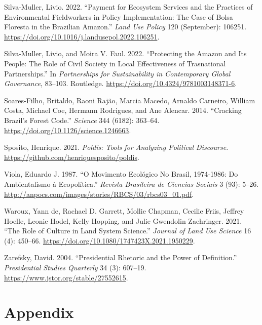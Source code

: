 \documentclass[
  12pt,
]{article}
\newlength{\cslhangindent}
\newlength{\cslentryspacingunit} %
\newenvironment{CSLReferences}[2] %
 {%
  \setlength{\parindent}{0pt}
  \ifodd #1
  \let\oldpar\par
  \def\par{\hangindent=\cslhangindent\oldpar}
  \fi
  \setlength{\parskip}{#2\cslentryspacingunit}
 }%
 {}
\begin{document}
\begin{CSLReferences}{1}{0}
\leavevmode{}%
Silva-Muller, Livio. 2022. {``Payment for Ecosystem Services and the
Practices of Environmental Fieldworkers in Policy Implementation: The
Case of Bolsa Floresta in the Brazilian Amazon.''} \emph{Land Use
Policy} 120 (September): 106251.
\url{https://doi.org/10.1016/j.landusepol.2022.106251}.

\leavevmode{}%
Silva-Muller, Livio, and Moira V. Faul. 2022. {``Protecting the Amazon
and Its People: The Role of Civil Society in Local Effectiveness of
Trasnational Partnerships.''} In \emph{Partnerships for Sustainability
in Contemporary Global Governance}, 83--103. Routledge.
\url{https://doi.org/10.4324/9781003148371-6}.

\leavevmode{}%
Soares-Filho, Britaldo, Raoni Rajão, Marcia Macedo, Arnaldo Carneiro,
William Costa, Michael Coe, Hermann Rodrigues, and Ane Alencar. 2014.
{``Cracking Brazil's Forest Code.''} \emph{Science} 344 (6182): 363--64.
\url{https://doi.org/10.1126/science.1246663}.

\leavevmode{}%
Sposito, Henrique. 2021. \emph{Poldis: Tools for Analyzing Political
Discourse}. \url{https://github.com/henriquesposito/poldis}.

\leavevmode{}%
Viola, Eduardo J. 1987. {``O Movimento Ecológico No Brasil, 1974-1986:
Do Ambientalismo à Ecopolítica.''} \emph{Revista Brasileira de Ciencias
Sociais} 3 (93): 5--26.
\url{http://anpocs.com/images/stories/RBCS/03/rbcs03_01.pdf}.

\leavevmode{}%
Waroux, Yann de, Rachael D. Garrett, Mollie Chapman, Cecilie Friis,
Jeffrey Hoelle, Leonie Hodel, Kelly Hopping, and Julie Gwendolin
Zaehringer. 2021. {``The Role of Culture in Land System Science.''}
\emph{Journal of Land Use Science} 16 (4): 450--66.
\url{https://doi.org/10.1080/1747423X.2021.1950229}.

\leavevmode{}%
Zarefsky, David. 2004. {``Presidential Rhetoric and the Power of
Definition.''} \emph{Presidential Studies Quarterly} 34 (3): 607--19.
\url{https://www.jstor.org/stable/27552615}.

\end{CSLReferences}

\newpage

\hypertarget{appendix}{%
\section{Appendix}\label{appendix}}
\end{document}
